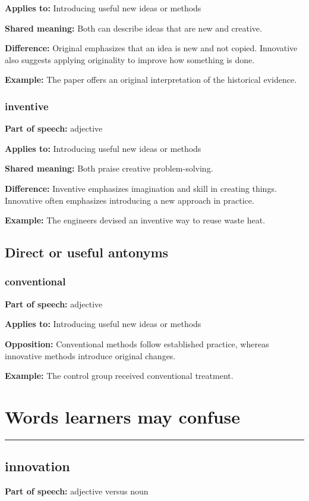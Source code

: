 \documentclass[11pt]{article}
\newcommand{\sectionrule}{\par\vspace{-0.5em}\noindent\textcolor{Accent}{\rule{\linewidth}{0.6pt}}\par}
\begin{document}
\textbf{Applies to:} Introducing useful new ideas or methods

\textbf{Shared meaning:} Both can describe ideas that are new and creative.

\textbf{Difference:} Original emphasizes that an idea is new and not copied. Innovative also suggests applying originality to improve how something is done.

\textbf{Example:} The paper offers an original interpretation of the historical evidence.

\subsubsection{inventive}
\textbf{Part of speech:} adjective

\textbf{Applies to:} Introducing useful new ideas or methods

\textbf{Shared meaning:} Both praise creative problem-solving.

\textbf{Difference:} Inventive emphasizes imagination and skill in creating things. Innovative often emphasizes introducing a new approach in practice.

\textbf{Example:} The engineers devised an inventive way to reuse waste heat.

\subsection{Direct or useful antonyms}
\subsubsection{conventional}
\textbf{Part of speech:} adjective

\textbf{Applies to:} Introducing useful new ideas or methods

\textbf{Opposition:} Conventional methods follow established practice, whereas innovative methods introduce original changes.

\textbf{Example:} The control group received conventional treatment.

\section{Words learners may confuse}
\sectionrule
\subsection{innovation}
\textbf{Part of speech:} adjective versus noun
\end{document}
